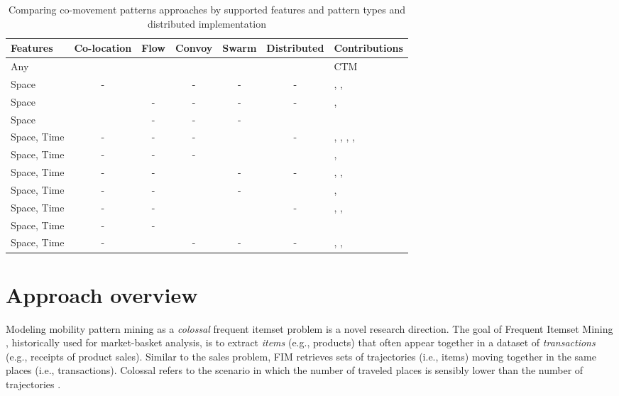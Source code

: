 \documentclass[
]{ceurart}
\newcommand{\cmark}{\ding{51}}%
\begin{document}
\begin{table}[t]
\centering
\scriptsize
\caption{Comparing co-movement patterns approaches by supported features and pattern types and distributed implementation}
\label{tab:related}
\begin{tabular}{lcccccp{4cm}}
\toprule
Features & Co-location & Flow & Convoy & Swarm & Distributed & Contributions \\
\midrule
Any & \cmark & \cmark & \cmark & \cmark & \cmark & CTM \\
Space & - & \cmark & - & - & - & \cite{DBLP:conf/mdm/SilvaLMZC20}, \cite{yang2021scpm}, \cite{tritsarolis2021online} \\
Space & \cmark & - & - & - & - & \cite{lv2019discovering}, \cite{tran2021spatial} \\
Space & \cmark & - & - & - & \cmark & \cite{fonseca2022multi} \\
Space, Time & - & - & - & \cmark & - & \cite{DBLP:conf/sigmod/LeeHW07}, \cite{DBLP:journals/pvldb/LiDHK10}, \cite{DBLP:journals/tkde/HanLO17}, \cite{ailin2019movement}, \cite{li2023relaxed} \\
Space, Time & - & - & - & \cmark & \cmark & \cite{DBLP:conf/icnc/HuKLZ15}, \cite{tampakis2019scalable} \\
Space, Time & - & - & \cmark & - & - & \cite{DBLP:conf/ssdbm/AungT10}, \cite{DBLP:journals/pvldb/OrakzaiCP19}, \cite{DBLP:conf/cikm/Liu0LLYW21} \\
Space, Time & - & - & \cmark & - & \cmark & \cite{DBLP:journals/geoinformatica/OrakzaiPC21}, \cite{tritsarolis2022predicting} \\
Space, Time & - & - & \cmark & \cmark & - & \cite{DBLP:journals/dke/LiBK15}, \cite{DBLP:journals/ijitdm/PhanPT16}, \cite{helmi2020multiscale} \\
Space, Time & - & - & \cmark & \cmark & \cmark & \cite{DBLP:journals/pvldb/FanZWT16} \\
Space, Time & - & \cmark & - & - & - & \cite{DBLP:journals/tmc/HanLO15}, \cite{DBLP:journals/tits/KumarWRLKP18}, \cite{DBLP:journals/pvldb/WangBCSQ19} \\
\bottomrule
\end{tabular}
\end{table}

\section{Approach overview}
\label{sec:Overview}

Modeling mobility pattern mining as a \textit{colossal} frequent itemset problem is a novel research direction. 
The goal of Frequent Itemset Mining \citep{DBLP:conf/vldb/AgrawalS94}, historically used for market-basket analysis, is to extract \textit{items} (e.g., products) that often appear together in a dataset of \textit{transactions} (e.g., receipts of product sales). 
Similar to the sales problem, FIM retrieves sets of trajectories (i.e., items) moving together in the same places (i.e., transactions). 
Colossal refers to the scenario in which the number of traveled places is sensibly lower than the number of trajectories \citep{DBLP:conf/kdd/PanCTYZ03}.
\end{document}
